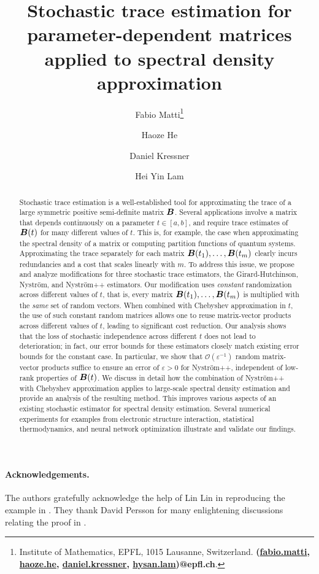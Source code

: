 \documentclass[11pt]{article}
\title{Stochastic trace estimation for parameter-dependent matrices applied to spectral density approximation}
\author{Fabio Matti\thanks{Institute of Mathematics, EPFL, 1015 Lausanne, Switzerland. {\textbf{(\href{mailto:fabio.matti@epfl.ch}{fabio.matti}, \href{mailto:haoze.he@epfl.ch}{haoze.he}, \href{mailto:daniel.kressner@epfl.ch}{daniel.kressner}, \href{mailto:hysan.lam@epfl.ch}{hysan.lam})@epfl.ch}}.}
\and Haoze He\footnotemark[1]
\and Daniel Kressner\footnotemark[1]
\and Hei Yin Lam\footnotemark[1]}
\begin{document}
\maketitle

\begin{abstract}
    Stochastic trace estimation is a well-established tool for approximating the trace of a large symmetric positive semi-definite matrix $\boldsymbol{B}$. Several applications involve a matrix that depends continuously on a parameter $t \in [a,b]$, and require trace estimates of $\boldsymbol{B}(t)$ for many different values of $t$. This is, for example, the case when approximating the spectral density of a matrix or computing partition functions of quantum systems. Approximating the trace separately for each matrix
    $\boldsymbol{B}(t_1), \dots, \boldsymbol{B}(t_m)$ clearly incurs redundancies and a cost that scales linearly with $m$. To address this issue, we propose and analyze modifications for three stochastic trace estimators, the Girard-Hutchinson, Nyström, and Nyström++ estimators. Our modification uses \emph{constant} randomization across different values of $t$, that is,
    every matrix $\boldsymbol{B}(t_1), \dots, \boldsymbol{B}(t_m)$ is multiplied with the \emph{same} set of random vectors.
    When combined with Chebyshev approximation in $t$, the use of such constant random matrices allows one to reuse matrix-vector products across different values of $t$, leading to significant cost reduction.
    Our analysis shows that the loss of stochastic independence across different $t$ does not lead to deterioration; in fact, our error bounds for these estimators closely match existing error bounds for the constant case. In particular, we show that $\mathcal{O}(\varepsilon^{-1})$ random matrix-vector products suffice to ensure an error of $\varepsilon > 0$ for Nyström++, independent of low-rank properties of $\boldsymbol{B}(t)$. We discuss in detail how the combination of Nyström++ with 
    Chebyshev approximation applies to large-scale spectral density estimation and provide an analysis of the resulting method. This  improves various aspects of an existing stochastic estimator for spectral density estimation. Several numerical experiments for examples from electronic structure interaction, statistical thermodynamics, and neural network optimization illustrate and validate our findings.
\end{abstract}







\paragraph{Acknowledgements.} The authors gratefully acknowledge the help of Lin Lin in reproducing the example in . They thank David Persson for many enlightening discussions relating the proof in .

\printbibliography


\end{document}
